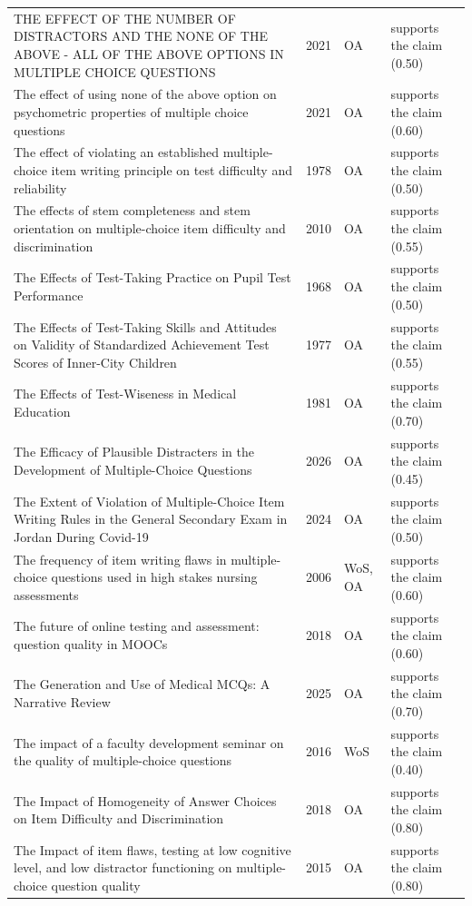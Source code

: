 \begin{longtable}{@{}%
  >{\raggedright\arraybackslash}p{}c%
  >{\raggedright\arraybackslash}p{}%
  >{\raggedright\arraybackslash}p{}@{}}
THE EFFECT OF THE NUMBER OF DISTRACTORS AND THE \textquotedbl{}NONE OF THE ABOVE\textquotedbl{} - \textquotedbl{}ALL OF THE ABOVE\textquotedbl{} OPTIONS IN MULTIPLE CHOICE QUESTIONS & 2021 & OA & supports the claim (0.50) \\
The effect of using \textquotedbl{}none of the above\textquotedbl{} option on psychometric properties of multiple choice questions & 2021 & OA & supports the claim (0.60) \\
The effect of violating an established multiple-choice item writing principle on test difficulty and reliability & 1978 & OA & supports the claim (0.50) \\
The effects of stem completeness and stem orientation on multiple-choice item difficulty and discrimination & 2010 & OA & supports the claim (0.55) \\
The Effects of Test-Taking Practice on Pupil Test Performance & 1968 & OA & supports the claim (0.50) \\
The Effects of Test-Taking Skills and Attitudes on Validity of Standardized Achievement Test Scores of Inner-City Children & 1977 & OA & supports the claim (0.55) \\
The Effects of Test-Wiseness in Medical Education & 1981 & OA & supports the claim (0.70) \\
The Efficacy of Plausible Distracters in the Development of Multiple-Choice Questions & 2026 & OA & supports the claim (0.45) \\
The Extent of Violation of Multiple-Choice Item Writing Rules in the General Secondary Exam in Jordan During Covid-19 & 2024 & OA & supports the claim (0.50) \\
The frequency of item writing flaws in multiple-choice questions used in high stakes nursing assessments & 2006 & WoS, OA & supports the claim (0.60) \\
The future of online testing and assessment: question quality in MOOCs & 2018 & OA & supports the claim (0.60) \\
The Generation and Use of Medical MCQs: A Narrative Review & 2025 & OA & supports the claim (0.70) \\
The impact of a faculty development seminar on the quality of multiple-choice questions & 2016 & WoS & supports the claim (0.40) \\
The Impact of Homogeneity of Answer Choices on Item Difficulty and Discrimination & 2018 & OA & supports the claim (0.80) \\
The Impact of item flaws, testing at low cognitive level, and low distractor functioning on multiple-choice question quality & 2015 & OA & supports the claim (0.80) \\

\end{longtable}
